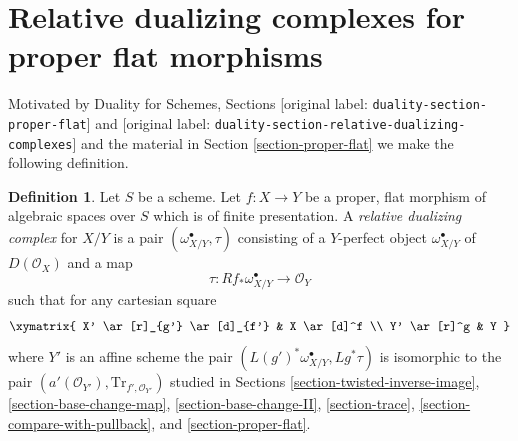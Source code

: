 \documentclass[10pt,a4paper]{article}
\theoremstyle{plain}
\theoremstyle{definition}
\newtheorem{definition}[subsection]{Definition}
\theoremstyle{remark}
\numberwithin{equation}{subsection}
\begin{document}
\section{Relative dualizing complexes for proper flat morphisms}
\label{section-relative-dualizing-proper-flat}

\noindent
Motivated by Duality for Schemes, Sections
\textnormal{[original label: \nolinkurl{duality-section-proper-flat}]} and
\textnormal{[original label: \nolinkurl{duality-section-relative-dualizing-complexes}]}
and the material in
Section \ref{section-proper-flat}
we make the following definition.

\begin{definition}
\label{definition-relative-dualizing-proper-flat}
Let $S$ be a scheme. Let $f : X \to Y$ be a proper, flat morphism
of algebraic spaces over $S$ which is of finite presentation.
A {\it relative dualizing complex} for $X/Y$ is a pair
$(\omega_{X/Y}^\bullet, \tau)$ consisting of a
$Y$-perfect object $\omega_{X/Y}^\bullet$ of $D(\mathcal{O}_X)$
and a map
$$
\tau : Rf_*\omega_{X/Y}^\bullet \longrightarrow \mathcal{O}_Y
$$
such that for any cartesian square
$$
\xymatrix{
X' \ar[r]_{g'} \ar[d]_{f'} & X \ar[d]^f \\
Y' \ar[r]^g & Y
}
$$
where $Y'$ is an affine scheme the pair
$(L(g')^*\omega_{X/Y}^\bullet, Lg^*\tau)$
is isomorphic to the pair
$(a'(\mathcal{O}_{Y'}), \text{Tr}_{f', \mathcal{O}_{Y'}})$
studied in Sections
\ref{section-twisted-inverse-image},
\ref{section-base-change-map},
\ref{section-base-change-II},
\ref{section-trace},
\ref{section-compare-with-pullback}, and
\ref{section-proper-flat}.
\end{definition}
\end{document}
